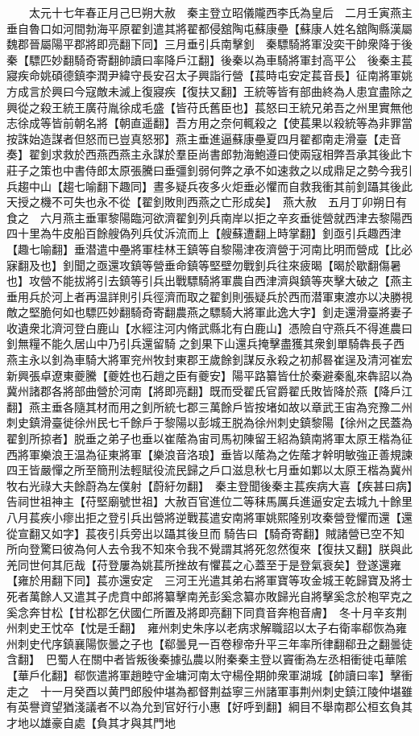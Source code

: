 　　太元十七年春正月己巳朔大赦　秦主登立昭儀隴西李氏為皇后　二月壬寅燕主垂自魯口如河間勃海平原翟釗遣其將翟都侵舘陶屯蘇康壘【蘇康人姓名舘陶縣漢屬魏郡晉屬陽平郡將即亮翻下同】三月垂引兵南擊釗　秦驃騎將軍没奕干帥衆降于後秦【驃匹妙翻騎奇寄翻帥讀曰率降戶江翻】後秦以為車騎將軍封高平公　後秦主萇寢疾命姚碩德鎮李潤尹緯守長安召太子興詣行營【萇時屯安定萇音長】征南將軍姚方成言於興曰今寇敵未滅上復寢疾【復扶又翻】王統等皆有部曲終為人患宜盡除之興從之殺王統王廣苻胤徐成毛盛【皆苻氏舊臣也】萇怒曰王統兄弟吾之州里實無他志徐成等皆前朝名將【朝直遥翻】吾方用之奈何輒殺之【使萇果以殺統等為非罪當按誅始造謀者但怒而已豈真怒邪】燕主垂進逼蘇康壘夏四月翟都南走滑臺【走音奏】翟釗求救於西燕西燕主永謀於羣臣尚書郎勃海鮑遵曰使兩寇相弊吾承其後此卞莊子之策也中書侍郎太原張騰曰垂彊釗弱何弊之承不如速救之以成鼎足之勢今我引兵趨中山【趨七喻翻下趣同】晝多疑兵夜多火炬垂必懼而自救我衝其前釗躡其後此天授之機不可失也永不從【翟釗敗則西燕之亡形成矣】　燕大赦　五月丁卯朔日有食之　六月燕主垂軍黎陽臨河欲濟翟釗列兵南岸以拒之辛亥垂徙營就西津去黎陽西四十里為牛皮船百餘艘偽列兵仗泝流而上【艘蘇遭翻上時掌翻】釗亟引兵趣西津【趣七喻翻】垂潜遣中壘將軍桂林王鎮等自黎陽津夜濟營于河南比明而營成【比必寐翻及也】釗聞之亟還攻鎮等營垂命鎮等堅壁勿戰釗兵往來疲暍【暍於歇翻傷暑也】攻營不能拔將引去鎮等引兵出戰驃騎將軍農自西津濟與鎮等夾擊大破之【燕主垂用兵於河上者再温詳則引兵徑濟而取之翟釗則張疑兵於西而潜軍東渡亦以决勝視敵之堅脆何如也驃匹妙翻騎奇寄翻農燕之驃騎大將軍此逸大字】釗走還滑臺將妻子收遺衆北濟河登白鹿山【水經注河内脩武縣北有白鹿山】憑險自守燕兵不得進農曰釗無糧不能久居山中乃引兵還留騎之釗果下山還兵掩擊盡獲其衆釗單騎犇長子西燕主永以釗為車騎大將軍兖州牧封東郡王歲餘釗謀反永殺之初郝晷崔逞及清河崔宏新興張卓遼東夔騰【夔姓也石趙之臣有夔安】陽平路纂皆仕於秦避秦亂來犇詔以為冀州諸郡各將部曲營於河南【將即亮翻】既而受翟氏官爵翟氏敗皆降於燕【降戶江翻】燕主垂各隨其材而用之釗所統七郡三萬餘戶皆按堵如故以章武王宙為兖豫二州刺史鎮滑臺徙徐州民七千餘戶于黎陽以彭城王脱為徐州刺史鎮黎陽【徐州之民蓋為翟釗所掠者】脱垂之弟子也垂以崔䕃為宙司馬初陳留王紹為鎮南將軍太原王楷為征西將軍樂浪王温為征東將軍【樂浪音洛琅】垂皆以䕃為之佐䕃才幹明敏強正善規諫四王皆嚴憚之所至簡刑法輕賦役流民歸之戶口滋息秋七月垂如鄴以太原王楷為冀州牧右光祿大夫餘蔚為左僕射【蔚紆勿翻】　秦主登聞後秦主萇疾病大喜【疾甚曰病】告祠世祖神主【苻堅廟號世祖】大赦百官進位二等秣馬厲兵進逼安定去城九十餘里八月萇疾小瘳出拒之登引兵出營將逆戰萇遣安南將軍姚熙隆别攻秦營登懼而還【還從宣翻又如字】萇夜引兵旁出以躡其後旦而騎告曰【騎奇寄翻】賊諸營已空不知所向登驚曰彼為何人去令我不知來令我不覺謂其將死忽然復來【復扶又翻】朕與此羌同世何其厄哉【苻登屢為姚萇所挫故有懼萇之心蓋至于是登氣衰矣】登遂還雍【雍於用翻下同】萇亦還安定　三河王光遣其弟右將軍寶等攻金城王乾歸寶及將士死者萬餘人又遣其子虎賁中郎將纂擊南羌彭奚念纂亦敗歸光自將擊奚念於枹罕克之奚念奔甘松【甘松郡乞伏國仁所置及將即亮翻下同賁音奔枹音膚】　冬十月辛亥荆州刺史王忱卒【忱是壬翻】　雍州刺史朱序以老病求解職詔以太子右衛率郗恢為雍州刺史代序鎮襄陽恢曇之子也【郗曇見一百卷穆帝升平三年率所律翻郗丑之翻曇徒含翻】　巴蜀人在關中者皆叛後秦據弘農以附秦秦主登以竇衝為左丞相衝徙屯華隂【華戶化翻】郗恢遣將軍趙睦守金墉河南太守楊佺期帥衆軍湖城【帥讀曰率】擊衝走之　十一月癸酉以黄門郎殷仲堪為都督荆益寧三州諸軍事荆州刺史鎮江陵仲堪雖有英譽資望猶淺議者不以為允到官好行小惠【好呼到翻】綱目不舉南郡公桓玄負其才地以雄豪自處【負其才與其門地
